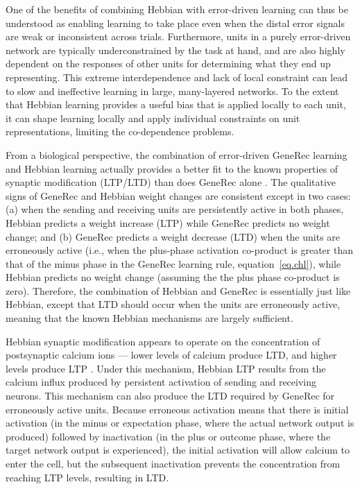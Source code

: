 \documentclass[12pt,twoside]{article}
\begin{document}
One of the benefits of combining Hebbian with error-driven learning
can thus be understood as enabling learning to take place even when
the distal error signals are weak or inconsistent across trials.
Furthermore, units in a purely error-driven network are typically
underconstrained by the task at hand, and are also highly dependent on
the responses of other units for determining what they end up
representing.  This extreme interdependence and lack of local
constraint can lead to slow and ineffective learning in large,
many-layered networks.  To the extent that Hebbian learning provides a
useful bias that is applied locally to each unit, it can shape
learning locally and apply individual constraints on unit
representations, limiting the co-dependence problems.

From a biological perspective, the combination of error-driven GeneRec
learning and Hebbian learning actually provides a better fit to the
known properties of synaptic modification (LTP/LTD) than does GeneRec
alone \cite{OReilly96}.  The qualitative signs of GeneRec and Hebbian
weight changes are consistent except in two cases: (a) when the
sending and receiving units are persistently active in both phases,
Hebbian predicts a weight increase (LTP) while GeneRec predicts no
weight change; and (b) GeneRec predicts a weight decrease (LTD) when
the units are erroneously active (i.e., when the plus-phase activation
co-product is greater than that of the minus phase in the GeneRec
learning rule, equation~\ref{eq.chl}), while Hebbian predicts no
weight change (assuming the the plus phase co-product is zero).
Therefore, the combination of Hebbian and GeneRec is essentially just
like Hebbian, except that LTD should occur when the units are
erroneously active, meaning that the known Hebbian mechanisms are
largely sufficient.

Hebbian synaptic modification appears to operate on the concentration
of postsynaptic calcium ions --- lower levels of calcium produce LTD,
and higher levels produce LTP
\cite{ArtolaBrocherSinger89,Lisman89,Lisman94,BearMalenka94}.  Under
this mechanism, Hebbian LTP results from the calcium influx produced
by persistent activation of sending and receiving neurons.  This
mechanism can also produce the LTD required by GeneRec for erroneously
active units.  Because erroneous activation means that there is
initial activation (in the minus or expectation phase, where the
actual network output is produced) followed by inactivation (in the
plus or outcome phase, where the target network output is
experienced), the initial activation will allow calcium to enter the
cell, but the subsequent inactivation prevents the concentration from
reaching LTP levels, resulting in LTD.
\end{document}
